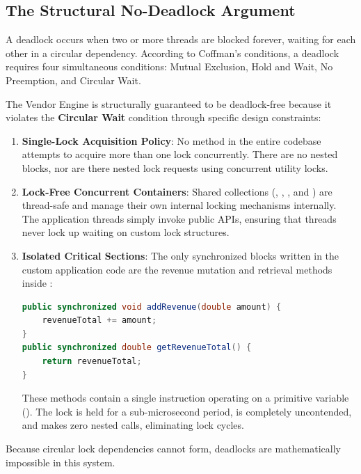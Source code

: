 \subsection{The Structural No-Deadlock Argument}
A deadlock occurs when two or more threads are blocked forever, waiting for each other in a circular dependency. According to Coffman's conditions, a deadlock requires four simultaneous conditions: Mutual Exclusion, Hold and Wait, No Preemption, and Circular Wait. 

The Vendor Engine is structurally guaranteed to be deadlock-free because it violates the \textbf{Circular Wait} condition through specific design constraints:
\begin{enumerate}
    \item \textbf{Single-Lock Acquisition Policy}: No method in the entire codebase attempts to acquire more than one lock concurrently. There are no nested  blocks, nor are there nested lock requests using concurrent utility locks.
    \item \textbf{Lock-Free Concurrent Containers}: Shared collections (, , , and ) are thread-safe and manage their own internal locking mechanisms internally. The application threads simply invoke public APIs, ensuring that threads never lock up waiting on custom lock structures.
    \item \textbf{Isolated Critical Sections}: The only synchronized blocks written in the custom application code are the revenue mutation and retrieval methods inside :
    \begin{lstlisting}[language=Java]
public synchronized void addRevenue(double amount) {
    revenueTotal += amount;
}
public synchronized double getRevenueTotal() {
    return revenueTotal;
}
    \end{lstlisting}
    These methods contain a single instruction operating on a primitive variable (). The lock is held for a sub-microsecond period, is completely uncontended, and makes zero nested calls, eliminating lock cycles.
\end{enumerate}
Because circular lock dependencies cannot form, deadlocks are mathematically impossible in this system.

